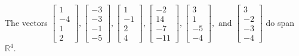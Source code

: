 \begin{exercise}
\begin{exerciseStatement}
  \end{exerciseStatement}
  \begin{exerciseAnswer}
   The vectors \(\left[\begin{array}{r}
1 \\
-4 \\
1 \\
2
\end{array}\right] , \left[\begin{array}{r}
-3 \\
-3 \\
-1 \\
-5
\end{array}\right] , \left[\begin{array}{r}
1 \\
-1 \\
2 \\
4
\end{array}\right] , \left[\begin{array}{r}
-2 \\
14 \\
-7 \\
-11
\end{array}\right] , \left[\begin{array}{r}
3 \\
1 \\
-5 \\
-4
\end{array}\right] , \text{ and } \left[\begin{array}{r}
3 \\
-2 \\
-3 \\
-4
\end{array}\right]\) 
  	 do  
	span \(\mathbb{R}^4\).
  


  \end{exerciseAnswer}
\end{exercise}